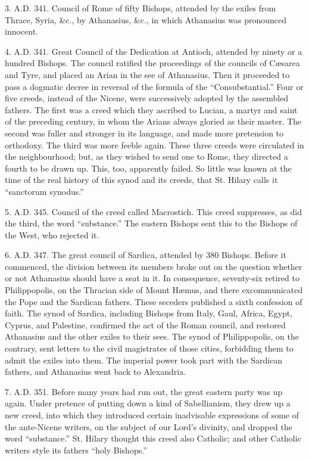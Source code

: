 3. A.D.
341. Council of Rome of fifty Bishops, attended by the exiles from
Thrace, Syria, \&c., by Athanasius, \&c., in which Athanasius was
pronounced innocent.

4. A.D.
341. Great Council of the Dedication at Antioch, attended by ninety or a
hundred Bishops. The council ratified the proceedings of the councils of
Cæsarea and Tyre, and placed an Arian in the see of Athanasius. Then it
proceeded to pass a dogmatic decree in reversal of the formula of the ``Consubstantial.''
Four or five creeds, instead of the Nicene, were successively adopted by
the assembled fathers. The first was a creed which they ascribed to
Lucian, a martyr and saint of the preceding century, in whom the Arians
always gloried as their master. The second was fuller and stronger in
its language, and made more pretension to orthodoxy. The third was more
feeble again. These three creeds were circulated in the neighbourhood;
but, as they wished to send one to Rome, they directed a fourth to be
drawn up. This, too, apparently failed. So little was known at the time
of the real history of this synod and its creeds, that St. Hilary calls
it ``sanctorum synodus.''

5. A.D.
345. Council of the creed called Macrostich. This creed suppresses, as
did the third, the word ``substance.'' The eastern Bishops sent this to
the Bishops of the West, who rejected it.

6. A.D.
347. The great council of Sardica, attended by 380 Bishops. Before it
commenced, the division between its members broke out on the question
whether or not Athanasius should have a seat in it. In consequence,
seventy-six retired to Philippopolis, on the Thracian side of Mount Hæmus,
and there excommunicated the Pope and the Sardican fathers. These
seceders published a sixth confession of faith. The synod of Sardica,
including Bishops from Italy, Gaul, Africa, Egypt, Cyprus, and
Palestine, confirmed the act of the Roman council, and restored
Athanasius and the other exiles to their sees. The synod of
Philippopolis, on the contrary, sent letters to the civil magistrates of
those cities, forbidding them to admit the exiles into them. The
imperial power took part with the Sardican fathers, and Athanasius went
back to Alexandria.

7. A.D.
351. Before many years had run out, the great eastern party was up
again. Under pretence of putting down a kind of Sabellianism, they drew
up a new creed, into which they introduced certain inadvisable
expressions of some of the ante-Nicene writers, on the subject of our
Lord's divinity, and dropped the word ``substance.'' St. Hilary thought
this creed also Catholic; and other Catholic writers style its fathers ``holy
Bishops.''


